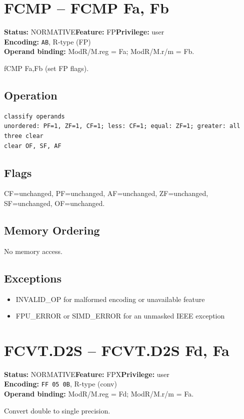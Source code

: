 \documentclass[10pt]{article}
\begin{document}
\section{FCMP -- FCMP Fa, Fb}
\textbf{Status:} NORMATIVE\quad \textbf{Feature:} FP\quad \textbf{Privilege:} user\\
\textbf{Encoding:} \texttt{AB}, R-type (FP)\\
\textbf{Operand binding:} ModR/M.reg = Fa; ModR/M.r/m = Fb.

fCMP Fa,Fb (set FP flags).

\subsection*{Operation}
\begin{lstlisting}
classify operands
unordered: PF=1, ZF=1, CF=1; less: CF=1; equal: ZF=1; greater: all three clear
clear OF, SF, AF
\end{lstlisting}
\subsection*{Flags}
CF=unchanged, PF=unchanged, AF=unchanged, ZF=unchanged, SF=unchanged, OF=unchanged.
\subsection*{Memory Ordering}
No memory access.
\subsection*{Exceptions}
\begin{itemize}
\item INVALID\_OP for malformed encoding or unavailable feature
\item FPU\_ERROR or SIMD\_ERROR for an unmasked IEEE exception
\end{itemize}
\clearpage

\section{FCVT.D2S -- FCVT.D2S Fd, Fa}
\textbf{Status:} NORMATIVE\quad \textbf{Feature:} FPX\quad \textbf{Privilege:} user\\
\textbf{Encoding:} \texttt{FF 05 0B}, R-type (conv)\\
\textbf{Operand binding:} ModR/M.reg = Fd; ModR/M.r/m = Fa.

Convert double to single precision.
\end{document}
